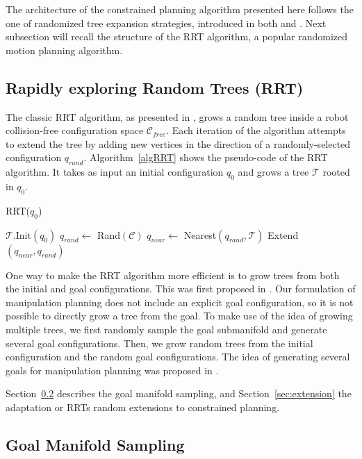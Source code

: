 \documentclass{article}
\begin{document}
The architecture of the constrained planning algorithm presented here follows
the one of randomized tree expansion strategies, introduced in both \cite{HsuLat99c} and
\cite{kuffner00rrtconnect}. Next subsection will recall the structure of the RRT algorithm,
a popular randomized motion planning algorithm.


\subsection{Rapidly exploring Random Trees (RRT)}

The classic RRT algorithm, as presented in  \cite{kuffner00rrtconnect}, grows 
a random tree inside a robot 
collision-free configuration space 
$\mathcal{C}_{free}$. Each iteration of the algorithm attempts to extend the tree
by adding new vertices in the direction of a randomly-selected configuration
$q_{rand}$. Algorithm~\ref{algRRT} shows the pseudo-code of the RRT algorithm.
It takes as input an initial configuration $q_0$ and grows a tree  $\mathcal{T}$ rooted 
in $q_0$. 

\begin{algorithm}
\caption{RRT($q_0$)}
\label{algRRT}
\begin{algorithmic}
\STATE $\mathcal{T}.$Init$(q_0)$
\STATE $q_{rand} \leftarrow $ Rand$(\mathcal{C})$
\STATE $q_{near} \leftarrow $ Nearest$(q_{rand},\mathcal{T})$
\STATE Extend$(q_{near},q_{rand})$
\ENDFOR

\end{algorithmic}
\end{algorithm}

One way to make the RRT algorithm more efficient is to grow trees from both the initial
and  goal configurations. This was first proposed in 
\cite{kuffner00rrtconnect}. Our formulation of manipulation planning does
not include an explicit goal configuration, so it is not possible to directly grow
a tree from the goal. To make use of the idea of growing multiple trees, we first
randomly sample the goal submanifold and generate several goal configurations. Then, 
we grow random
trees from the initial configuration and the random goal configurations. The idea of
generating several goals for manipulation planning was proposed in \cite{diankov2008bpc}.

Section~\ref{sec:goal-sampling}  describes the goal manifold sampling, and 
Section~\ref{sec:extension} the adaptation or RRTs random extensions to constrained planning.

\subsection{Goal Manifold Sampling}
\label{sec:goal-sampling}
\end{document}

